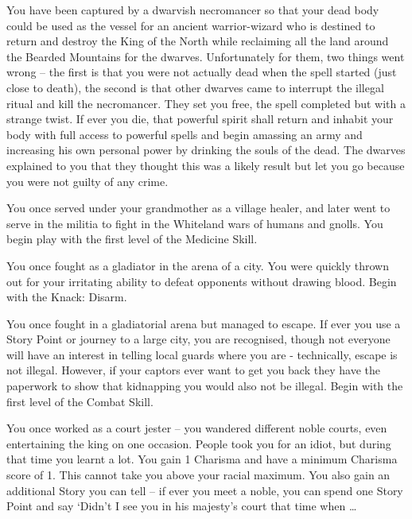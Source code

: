 \begin{list}{\addtocounter{list}{1}\textbf{:}}{\raggedleft}
\item{ You have been captured by a dwarvish necromancer so that your dead body could be used as the vessel for an ancient warrior-wizard who is destined to return and destroy the King of the North while reclaiming all the land around the Bearded Mountains for the dwarves.  Unfortunately for them, two things went wrong -- the first is that you were not actually dead when the spell started (just close to death), the second is that other dwarves came to interrupt the illegal ritual and kill the necromancer.  They set you free, the spell completed but with a strange twist.  If ever you die, that powerful spirit shall return and inhabit your body with full access to powerful spells and begin amassing an army and increasing his own personal power by drinking the souls of the dead.  The dwarves explained to you that they thought this was a likely result but let you go because you were not guilty of any crime. }

\item{ You once served under your grandmother as a village healer, and later went to serve in the militia to fight in the Whiteland wars of humans and gnolls.  You begin play with the first level of the Medicine Skill. }

\item{ You once fought as a gladiator in the arena of a city.  You were quickly thrown out for your irritating ability to defeat opponents without drawing blood.  Begin with the Knack: Disarm. }

\item{ You once fought in a gladiatorial arena but managed to escape.  If ever you use a Story Point or journey to a large city, you are recognised, though not everyone will have an interest in telling local guards where you are - technically, escape is not illegal.  However, if your captors ever want to get you back they have the paperwork to show that kidnapping you would also not be illegal.  Begin with the first level of the Combat Skill. }

\item{ You once worked as a court jester -- you wandered different noble courts, even entertaining the king on one occasion.  People took you for an idiot, but during that time you learnt a lot.  You gain 1 Charisma and have a minimum Charisma score of 1.  This cannot take you above your racial maximum.  You also gain an additional Story you can tell -- if ever you meet a noble, you can spend one Story Point and say `Didn't I see you in his majesty's court that time when \ldots}


\end{list}
